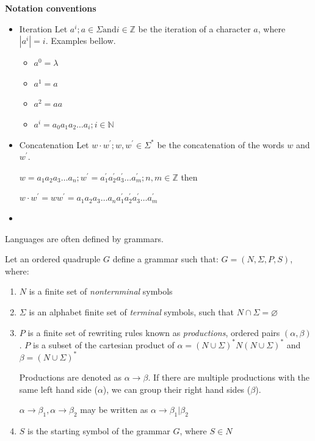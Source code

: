 \begin{samepage}
\begin{large}
\textbf{Notation conventions}
\end{large}

\begin{itemize}
\item Iteration
Let $a^i; a \in \Sigma \text{and} i \in \mathbb{Z}$ be the iteration of a character $a$, where $|a^i| = i$.
Examples bellow.
\begin{itemize}
\item $a^0 = \lambda$
\item $a^1 = a$
\item $a^2 = aa$
\item $a^i = a_0 a_1 a_2 \dots a_i; i \in \mathbb{N}$
\end{itemize}


\item Concatenation
Let $w \cdot w^{'}; w, w^{'} \in \Sigma^{*}$ be the concatenation of the words $w$ and $w^{'}$.

$w = a_1 a_2 a_3 \dots a_n ; w^{'} = a^{'}_1 a^{'}_2 a^{'}_3 \dots a^{'}_m; n,m \in \mathbb{Z}$ then

$w\cdot w^{'} = w w^{'} = a_1 a_2 a_3 \dots a_n a^{'}_1 a^{'}_2 a^{'}_3 \dots a^{'}_m$
\item {}
\end{itemize}
\end{samepage}

Languages are often defined by grammars.
\begin{definition}[Grammar]
\label{def:grammar}
\cite{formal_languages}
Let an ordered quadruple $G$ define a grammar such that: $G=\left(N, \Sigma, P, S \right)$, where:
\begin{enumerate}
\item $N$ is a finite set of \emph{nonternminal} symbols
\item $\Sigma$ is an alphabet finite set of \emph{terminal} symbols, such that $N \cap \Sigma = \varnothing$
\item $P$ is a finite set of rewriting rules known as \emph{productions}, ordered pairs $\left( \alpha, \beta \right)$.
$P$ is a subset of the cartesian product of $\alpha = \left(N \cup \Sigma\right)^* N \left(N \cup \Sigma\right)^*$ and $\beta = \left(N \cup \Sigma\right)^*$


Productions are denoted as $\alpha \rightarrow \beta$.
If there are multiple productions with the same left hand side ($\alpha$), we can group their right hand sides ($\beta$).


$\alpha \rightarrow \beta_1, \alpha \rightarrow \beta_2$ may be written as $\alpha \rightarrow \beta_1 | \beta_2$

\item $S$ is the starting symbol of the grammar $G$, where $S \in N$
\end{enumerate}
\end{definition}

